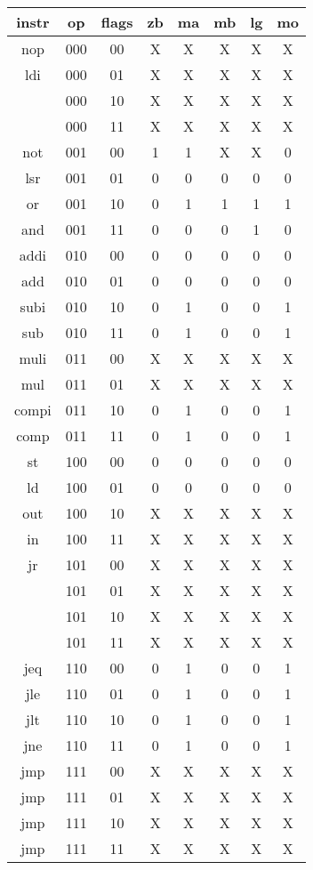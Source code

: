 \documentclass[twoside, 12pt, a4paper]{article}
\begin{document}
\begin{center}
	\ttfamily
	\begin{tabular}{|c|c|c|c|c|c|c|c|}
		\hline
		instr	& op & flags & zb & ma & mb & lg & mo \\
		\hline
		nop		& 000 & 00 & X & X & X & X & X \\
		ldi		& 000 & 01 & X & X & X & X & X \\
				& 000 & 10 & X & X & X & X & X \\
				& 000 & 11 & X & X & X & X & X \\
		\hline
		not		& 001 & 00 & 1 & 1 & X & X & 0 \\
		lsr		& 001 & 01 & 0 & 0 & 0 & 0 & 0 \\
		or		& 001 & 10 & 0 & 1 & 1 & 1 & 1 \\
		and		& 001 & 11 & 0 & 0 & 0 & 1 & 0 \\
		\hline
		addi	& 010 & 00 & 0 & 0 & 0 & 0 & 0 \\
		add		& 010 & 01 & 0 & 0 & 0 & 0 & 0 \\
		subi	& 010 & 10 & 0 & 1 & 0 & 0 & 1 \\
		sub		& 010 & 11 & 0 & 1 & 0 & 0 & 1 \\
		\hline
		muli	& 011 & 00 & X & X & X & X & X \\
		mul		& 011 & 01 & X & X & X & X & X \\
		compi	& 011 & 10 & 0 & 1 & 0 & 0 & 1 \\
		comp	& 011 & 11 & 0 & 1 & 0 & 0 & 1 \\
		\hline
		st		& 100 & 00 & 0 & 0 & 0 & 0 & 0 \\
		ld		& 100 & 01 & 0 & 0 & 0 & 0 & 0 \\
		out		& 100 & 10 & X & X & X & X & X \\
		in		& 100 & 11 & X & X & X & X & X \\
		\hline
		jr		& 101 & 00 & X & X & X & X & X \\
				& 101 & 01 & X & X & X & X & X \\
				& 101 & 10 & X & X & X & X & X \\
				& 101 & 11 & X & X & X & X & X \\
		\hline
		jeq		& 110 & 00 & 0 & 1 & 0 & 0 & 1 \\
		jle		& 110 & 01 & 0 & 1 & 0 & 0 & 1 \\
		jlt		& 110 & 10 & 0 & 1 & 0 & 0 & 1 \\
		jne		& 110 & 11 & 0 & 1 & 0 & 0 & 1 \\
		\hline
		jmp		& 111 & 00 & X & X & X & X & X \\
		jmp		& 111 & 01 & X & X & X & X & X \\
		jmp		& 111 & 10 & X & X & X & X & X \\
		jmp		& 111 & 11 & X & X & X & X & X \\
		\hline
	\end{tabular}
\end{center}
\end{document}
